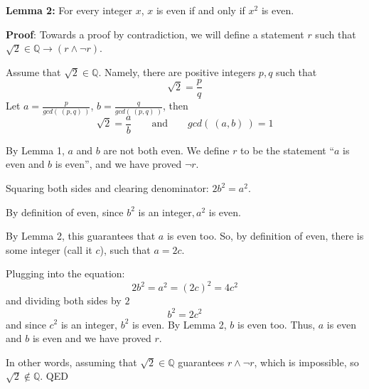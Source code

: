 \documentclass[12pt, oneside]{article}
\begin{document}
{\bf Lemma 2:} For every integer  $x$, $x$ is  even if and only if $x^2$  is even.


{\bf Proof}: Towards a proof by contradiction, we will define a statement 
$r$ such that $\sqrt{2} \in \mathbb{Q} \to (r \land \lnot r)$. 

Assume that $\sqrt{2} \in \mathbb{Q}$. Namely, there are positive integers
$p, q$ such that 
\[
    \sqrt{2} = \frac{p}{q}
\]
Let $a= \frac{p}{gcd( ~(p,q)~)}$, $b = \frac{q}{gcd(~(p,q)~)}$, then 
\[
    \sqrt{2} = \frac{a}{b} \qquad \text{and} \qquad gcd(~(a,b)~) = 1
\]

By Lemma 1, $a$ and $b$ are not both even. We define $r$ to be the 
statement ``$a$ is even and $b$ is even'', and we have proved $\lnot r$.

Squaring both sides and clearing denominator: $2b^2 = a^2$.

By definition of even, since $b^2$ is an integer$, a^2$ is even.

By Lemma 2, this guarantees that $a$ is even too. So, by 
definition of even, there is some integer (call it $c$), such that $a = 2c$.

Plugging into the equation:
\[
    2b^2 = a^2 = (2c)^2 = 4c^2
\]
and dividing both sides by $2$
\[
    b^2 = 2c^2
\]
and since $c^2$ is an integer, $b^2$ is even. By Lemma 2, $b$ is even too.
Thus, $a$ is even and $b$ is even and we have proved $r$. 

In other words, assuming that $\sqrt{2} \in \mathbb{Q}$ guarantees $r \land \lnot r$, 
which is impossible, so $\sqrt{2} \notin \mathbb{Q}$. QED

 
\newpage
\end{document}
